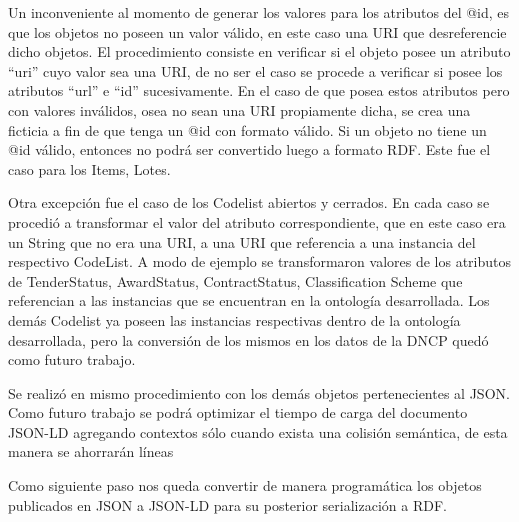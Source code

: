 Un inconveniente al momento de generar los valores para los atributos del @id, es que los objetos no poseen un valor válido, en este caso una URI que desreferencie dicho objetos. El procedimiento consiste en verificar si el objeto posee un atributo “uri” cuyo valor sea una URI, de no ser el caso se procede a verificar si posee los atributos “url” e “id” sucesivamente. En el caso de que posea estos atributos pero con valores inválidos, osea no sean una URI propiamente dicha, se crea una ficticia a fin de que tenga un @id con formato válido. Si un objeto no tiene un @id válido, entonces no podrá ser convertido luego a formato RDF. Este fue el caso para los Items, Lotes.

Otra excepción fue el caso de los Codelist abiertos y cerrados. En cada caso se procedió a transformar el valor del atributo correspondiente, que en este caso era un String que no era una URI, a una URI que referencia a una instancia del respectivo CodeList. A modo de ejemplo se transformaron valores de los atributos de TenderStatus, AwardStatus, ContractStatus, Classification Scheme que referencian a las instancias que se encuentran en la ontología desarrollada. Los demás Codelist ya poseen las instancias respectivas dentro de la ontología desarrollada, pero la conversión de los mismos en los datos de la DNCP quedó como futuro trabajo.

Se realizó en mismo procedimiento con los demás objetos pertenecientes al JSON. Como futuro trabajo se podrá optimizar el tiempo de carga del documento JSON-LD agregando contextos sólo cuando exista una colisión semántica, de esta manera se ahorrarán líneas

Como siguiente paso nos queda convertir de manera programática los objetos publicados en JSON a JSON-LD para su posterior serialización a RDF.

